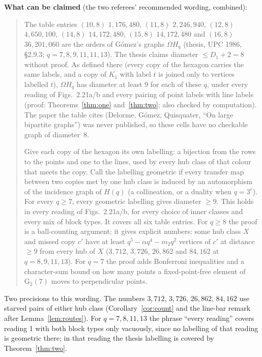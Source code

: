 \documentclass[11pt]{amsart}
\theoremstyle{plain}
\theoremstyle{definition}
\theoremstyle{remark}
\newcommand{\GG}{\mathrm{G}_2}
\newcommand{\Om}{\Omega}
\begin{document}
\noindent\textbf{What can be claimed} (the two referees' recommended wording, combined):
\begin{quote}\small
The table entries $(10,8)$ $1{,}176{,}480$, $(11,8)$ $2{,}246{,}940$, $(12,8)$ $4{,}650{,}100$, $(14,8)$
$14{,}172{,}480$, $(15,8)$ $14{,}172{,}480$ and $(16,8)$ $36{,}201{,}060$ are the orders of Gómez's graphs $\Om H_q$
(thesis, UPC 1986, \S2.9.3; $q = 7, 8, 9, 11, 11, 13$). The thesis claims diameter $\le D_1 + 2 = 8$ without proof. As
defined there (every copy of the hexagon carries the same labels, and a copy of $K_1$ with label $t$ is joined only to
vertices labelled $t$), $\Om H_q$ has diameter at least $9$ for each of these $q$, under every reading of Figs.~2.21a/b
and every pairing of point labels with line labels (proof: Theorems~\ref{thm:one} and~\ref{thm:two}; also checked by
computation). The paper the table cites (Delorme, Gómez, Quisquater, ``On large bipartite graphs'') was never
published, so these cells have no checkable graph of diameter~$8$.

Give each copy of the hexagon its own labelling: a bijection from the rows to the points and one to the lines, used by
every hub class of that colour that meets the copy. Call the labelling geometric if every transfer map between two
copies met by one hub class is induced by an automorphism of the incidence graph of $H(q)$ (a collineation, or a duality
when $q = 3^e$). For every $q \ge 7$, every geometric labelling gives diameter $\ge 9$. This holds in every reading of
Figs.~2.21a/b, for every choice of inner classes and every mix of block types. It covers all six table entries. For
$q \ge 8$ the proof is a ball-counting argument; it gives explicit numbers: some hub class $X$ and missed copy $c'$ have
at least $q^5 - \alpha q^4 - m_2q^2$ vertices of $c'$ at distance $\ge 9$ from every hub of $X$ ($3{,}712$, $3{,}726$,
$26{,}862$ and $84{,}162$ at $q = 8, 9, 11, 13$). For $q = 7$ the proof adds Bonferroni inequalities and a character-sum
bound on how many points a fixed-point-free element of $\GG(7)$ moves to perpendicular points.
\end{quote}
\noindent Two precisions to this wording. The numbers $3{,}712$, $3{,}726$, $26{,}862$, $84{,}162$ use starved pairs of
either hub class (Corollary~\ref{cor:count} and the line-bar remark after Lemma~\ref{lem:routes}). For $q = 7, 8, 11,
13$ the phrase ``every reading'' covers reading 1 with both block types only vacuously, since no labelling of that
reading is geometric there; in that reading the thesis labelling is covered by Theorem~\ref{thm:two}.
\end{document}
